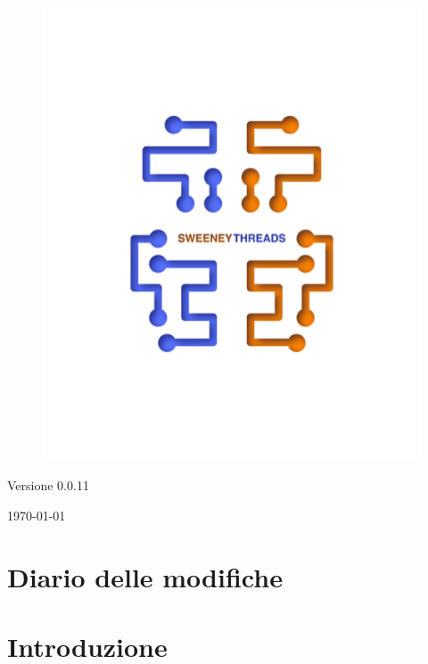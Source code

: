 \documentclass[a4paper]{article}
\begin{document}
\begin{titlepage}
		\begin{figure}[H]
			\centering
			\includegraphics[scale=0.8]{sweeney.png}
		\end{figure}
		\begin{center}
			Versione 0.0.11
		\end{center}
		{\large \today} \\ [3cm] 
		\vfill  
	\end{titlepage}
	
	
	\tableofcontents
	
	\newpage 
	\section*{Diario delle modifiche}

	\newpage \section{Introduzione}
\end{document}
